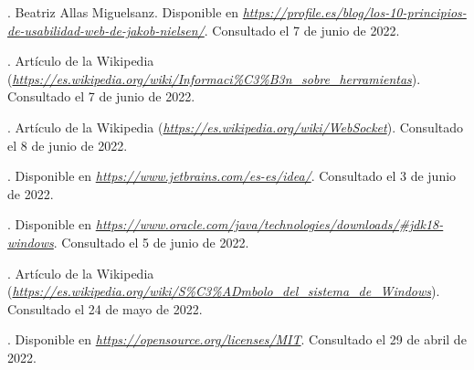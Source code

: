 \begin{thebibliography}{99}
. Beatriz Allas Miguelsanz. Disponible en {\it \url{https://profile.es/blog/los-10-principios-de-usabilidad-web-de-jakob-nielsen/}}. Consultado el 7 de junio de 2022.

. Artículo de la Wikipedia ({\it \url{https://es.wikipedia.org/wiki/Informaci%C3%B3n_sobre_herramientas}}). Consultado el 7 de junio de 2022.

. Artículo de la Wikipedia ({\it \url{https://es.wikipedia.org/wiki/WebSocket}}). Consultado el 8 de junio de 2022.

. Disponible en {\it \url{https://www.jetbrains.com/es-es/idea/}}. Consultado el 3 de junio de 2022.

. Disponible en {\it \url{https://www.oracle.com/java/technologies/downloads/#jdk18-windows}}. Consultado el 5 de junio de 2022.

. Artículo de la Wikipedia ({\it \url{https://es.wikipedia.org/wiki/S%C3%ADmbolo_del_sistema_de_Windows}}). Consultado el 24 de mayo de 2022.

. Disponible en {\it \url{https://opensource.org/licenses/MIT}}. Consultado el 29 de abril de 2022.
\end{thebibliography}